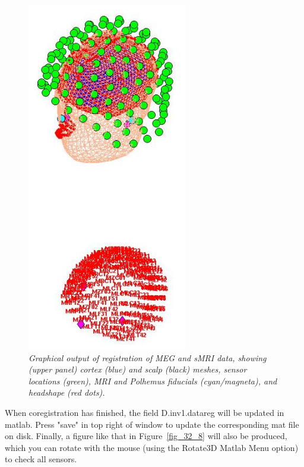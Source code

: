 \begin{figure}
\begin{center}
\includegraphics[width=70mm]{multimodal/figures/figure_32_17}
\caption{\em  Graphical output of registration of MEG and sMRI data, showing (upper panel) cortex (blue) and scalp (black) meshes, sensor locations (green), MRI and Polhemus fiducials (cyan/magneta), and headshape (red dots).\label{fig_32_17}}
\end{center}
\end{figure}

When coregistration has finished, the field D.inv{1}.datareg will be updated in matlab. Press "save" in top right of window to update the corresponding mat file on disk. Finally, a figure like that in Figure~\ref{fig_32_8} will also be produced, which you can rotate with the mouse (using the Rotate3D Matlab Menu option) to check all sensors.

